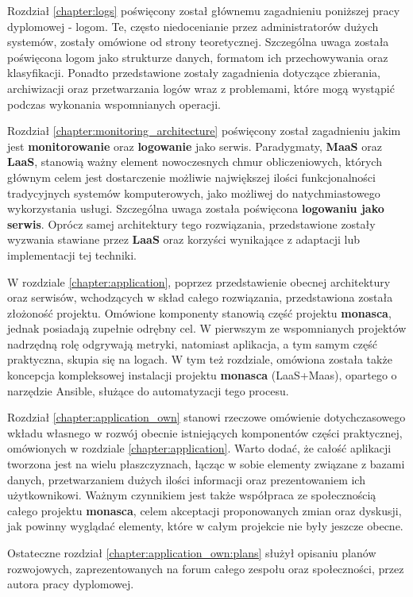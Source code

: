 Rozdział \ref{chapter:logs} poświęcony został głównemu zagadnieniu poniższej pracy dyplomowej - logom.
Te, często niedocenianie przez administratorów dużych systemów, zostały omówione od strony teoretycznej. Szczególna uwaga 
została poświęcona logom jako strukturze danych, formatom ich przechowywania oraz klasyfikacji. Ponadto przedstawione zostały 
zagadnienia dotyczące zbierania, archiwizacji oraz przetwarzania logów wraz z problemami, które mogą wystąpić 
podczas wykonania wspomnianych operacji.

Rozdział \ref{chapter:monitoring_architecture} poświęcony został zagadnieniu jakim jest
\textbf{monitorowanie} oraz \textbf{logowanie} jako serwis. Paradygmaty, \textbf{MaaS} oraz \textbf{LaaS}, stanowią ważny 
element nowoczesnych chmur obliczeniowych, których głównym celem jest dostarczenie możliwie największej ilości 
funkcjonalności tradycyjnych systemów komputerowych, jako możliwej do natychmiastowego wykorzystania usługi. Szczególna uwaga 
została poświęcona \textbf{logowaniu jako serwis}. Oprócz samej architektury tego rozwiązania, przedstawione zostały wyzwania 
stawiane przez \textbf{LaaS} oraz korzyści wynikające z adaptacji lub implementacji tej techniki.

W rozdziale \ref{chapter:application}, poprzez przedstawienie obecnej architektury oraz serwisów, wchodzących w skład całego 
rozwiązania, przedstawiona została złożoność projektu. Omówione komponenty stanowią część projektu \textbf{monasca}, jednak
posiadają zupełnie odrębny cel. W pierwszym ze wspomnianych projektów nadrzędną rolę odgrywają metryki, natomiast
aplikacja, a tym samym część praktyczna, skupia się na logach. W tym też rozdziale, omówiona została także
koncepcja kompleksowej instalacji projektu \textbf{monasca} (LaaS+Maas), opartego o narzędzie Ansible, 
służące do automatyzacji tego procesu.

Rozdział \ref{chapter:application_own} stanowi rzeczowe omówienie dotychczasowego wkładu własnego w rozwój obecnie istniejących
komponentów części praktycznej, omówionych w rozdziale \ref{chapter:application}. Warto dodać, że całość aplikacji tworzona 
jest na wielu płaszczyznach, łącząc w sobie elementy związane z bazami danych, przetwarzaniem dużych ilości informacji
oraz prezentowaniem ich użytkownikowi. Ważnym czynnikiem jest także współpraca ze społecznością całego 
projektu \textbf{monasca}, celem akceptacji proponowanych zmian oraz dyskusji, jak powinny wyglądać elementy, które w całym 
projekcie nie były jeszcze obecne.

Ostateczne rozdział \ref{chapter:application_own:plans} służył opisaniu planów rozwojowych, zaprezentowanych na
forum całego zespołu oraz społeczności, przez autora pracy dyplomowej. 